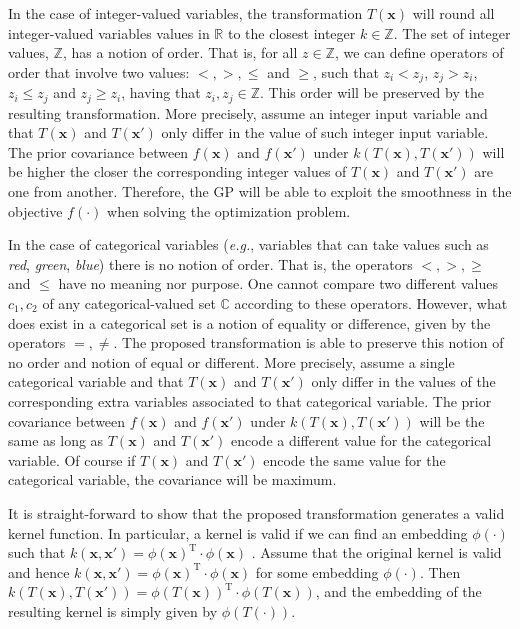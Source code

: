 In the case of integer-valued variables, the transformation $T(\mathbf{x})$ will round all integer-valued
variables values in $\mathds{R}$ to the closest integer $k \in \mathds{Z}$. The set of integer values,
$\mathds{Z}$, has a notion of order. That is, for all $z \in \mathbb{Z}$, we can define operators of order
that involve two values: $<,>,\leq$ and $\geq$, such that $z_i < z_j$, $z_j > z_i$, $z_i \leq z_j$ and
$z_j \geq z_i$, having that $z_i,z_j \in \mathbb{Z}$. This order will be preserved by the
resulting transformation. More precisely, assume an integer input variable and that $T(\mathbf{x})$ and $T(\mathbf{x}')$
only differ in the value of such integer input variable. The prior covariance between
$f(\mathbf{x})$ and $f(\mathbf{x}')$ under $k(T(\mathbf{x}),T(\mathbf{x}'))$ will be higher the closer the
corresponding integer values of $T(\mathbf{x})$ and $T(\mathbf{x}')$ are one from another. Therefore, the GP
will be able to exploit the smoothness in the objective $f(\cdot)$ when solving the optimization problem.

In the case of categorical variables (\emph{e.g.}, variables that can take values such as
\emph{red}, \emph{green}, \emph{blue}) there is no notion of order. That is, the operators
$<,>,\geq$ and $\leq$ have no meaning nor purpose. One cannot compare two different
values $c_1,c_2$ of any categorical-valued set $\mathds{C}$ according to these operators. However,
what does exist in a categorical set is a notion of equality or difference, given by the operators $=,\neq$.
The proposed transformation is able to preserve this notion of no order and notion of equal or
different. More precisely, assume a single categorical variable and that $T(\mathbf{x})$ and $T(\mathbf{x}')$
only differ in the values of the corresponding extra variables associated to that categorical variable.
The prior covariance between $f(\mathbf{x})$ and $f(\mathbf{x}')$ under
$k(T(\mathbf{x}),T(\mathbf{x}'))$ will be the same as long as $T(\mathbf{x})$ and $T(\mathbf{x}')$
encode a different value for the categorical variable. Of course if $T(\mathbf{x})$ and $T(\mathbf{x}')$
encode the same value for the categorical variable, the covariance will be maximum.

It is straight-forward to show that the proposed transformation generates a valid kernel function.
In particular, a kernel is valid if we can find an embedding $\phi(\cdot)$ such that $k(\mathbf{x},\mathbf{x}')=
\phi(\mathbf{x})^\text{T}\cdot \phi(\mathbf{x})$ \cite{shawe2004kernel}. Assume that the original kernel is valid
and hence $k(\mathbf{x},\mathbf{x}')= \phi(\mathbf{x})^\text{T}\cdot \phi(\mathbf{x})$ for some embedding $\phi(\cdot)$.
Then $k(T(\mathbf{x}),T(\mathbf{x}'))= \phi(T(\mathbf{x}))^\text{T}\cdot \phi(T(\mathbf{x}))$, and the  embedding
of the resulting kernel is simply given by $\phi(T(\cdot))$.

